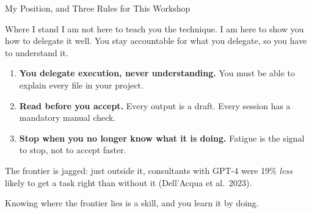\documentclass[svgnames,x11names,dvipsnames]{beamer}
\begin{document}
\begin{frame}{My Position, and Three Rules for This Workshop}

\begin{alertblock}{Where I stand}
I am not here to teach you the technique. I am here to show you how to delegate it well.
You stay accountable for what you delegate, so you have to understand it.
\end{alertblock}

\vspace{0.3cm}

\begin{enumerate}
    \item \textbf{You delegate execution, never understanding.} You must be able to explain every file in your project.
    \vspace{0.1cm}
    \item \textbf{Read before you accept.} Every output is a draft. Every session has a mandatory manual check.
    \vspace{0.1cm}
    \item \textbf{Stop when you no longer know what it is doing.} Fatigue is the signal to stop, not to accept faster.
\end{enumerate}

\vspace{0.3cm}

{\small The frontier is jagged: just outside it, consultants with GPT-4 were 19\% \emph{less} likely to get a task right than without it (Dell'Acqua et al.\ 2023).

\vspace{0.15cm}
\alert{Knowing where the frontier lies is a skill, and you learn it by doing.}}

\end{frame}
\end{document}
